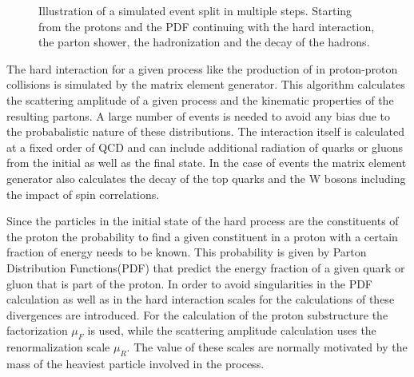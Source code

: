 \begin{figure}[htbp!]
  \begin{center}
\caption{Illustration of a simulated event split in multiple steps. Starting from the protons and the PDF continuing with the hard interaction, the parton shower, the hadronization and the decay of the hadrons\cite{Dobbs:684090}.
  \label{fig:sim_struct}}
  \end{center}
\end{figure}

The hard interaction for a given process like the production of \ttbar in proton-proton collisions is simulated by the matrix element generator.
This algorithm calculates the scattering amplitude of a given process and the kinematic properties of the resulting partons.
A large number of events is needed to avoid any bias due to the probabalistic nature of these distributions.
The interaction itself is calculated at a fixed order of QCD and can include additional radiation of quarks or gluons from the initial as well as the final state.
In the case of \ttbar events the matrix element generator also calculates the decay of the top quarks and the W bosons including the impact of spin correlations.

Since the particles in the initial state of the hard process are the constituents of the proton the probability to find a given constituent in a proton with a certain fraction of energy needs to be known.
This probability is given by Parton Distribution Functions(PDF) that predict the energy fraction of a given quark or gluon that is part of the proton.
In order to avoid singularities in the PDF calculation as well as in the hard interaction scales for the calculations of these divergences are introduced.
For the calculation of the proton substructure the factorization $\mu_F$ is used, while the scattering amplitude calculation uses the renormalization scale $\mu_R$.
The value of these scales are normally motivated by the mass of the heaviest particle involved in the process.

